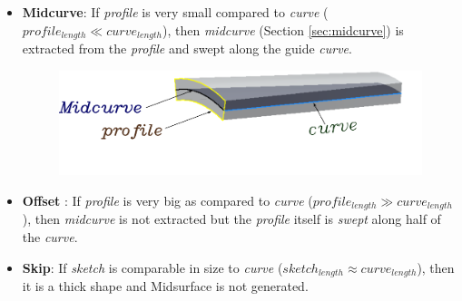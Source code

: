 \begin{itemize}[noitemsep,topsep=2pt,parsep=2pt,partopsep=2pt]

\item {\bf Midcurve}: If {\em profile} is very small compared to {\em curve} ( $profile_{length} \ll curve_{length}$), then {\em midcurve} (Section \ref{sec:midcurve}) is extracted from the {\em profile} and swept  along the guide {\em curve}.

\begin{figure}[h]
\centering \includegraphics[scale=0.5]{../Common/images//MidsurfSmallProfile_1.pdf} 
\label{figure_MidsurfSmallProfile}
\end{figure}

\vspace{-0.5cm}

\item {\bf Offset} :  If {\em profile} is very big as compared to {\em curve} ($profile_{length} \gg curve_{length}$), then {\em midcurve} is not extracted  but the {\em profile} itself is {\em swept} along half of the {\em curve}. 

\item {\bf Skip}:   If {\em sketch} is comparable in size to {\em curve}  ($sketch_{length} \approx curve_{length}$), then it is a thick shape and Midsurface is not generated.

\end{itemize}

			
